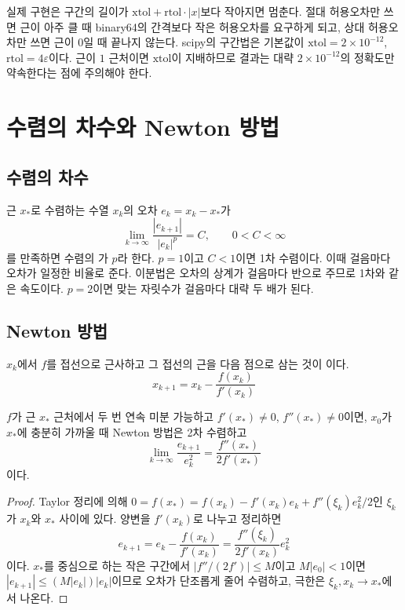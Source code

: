 실제 구현은 구간의 길이가 $\mathrm{xtol}+\mathrm{rtol}\cdot|x|$보다 작아지면 멈춘다. 절대 허용오차만 쓰면 근이 아주 클 때 binary64의 간격보다 작은 허용오차를 요구하게 되고, 상대 허용오차만 쓰면 근이 $0$일 때 끝나지 않는다. scipy의 구간법은 기본값이 $\mathrm{xtol}=2\times10^{-12}$, $\mathrm{rtol}=4\varepsilon$이다. 근이 $1$ 근처이면 $\mathrm{xtol}$이 지배하므로 결과는 대략 $2\times10^{-12}$의 정확도만 약속한다는 점에 주의해야 한다.

\section{수렴의 차수와 Newton 방법}
\label{sec:newton}

\subsection{수렴의 차수}

근 $x_\ast$로 수렴하는 수열 $x_k$의 오차 $e_k=x_k-x_\ast$가
\[
\lim_{k\to\infty}\frac{|e_{k+1}|}{|e_k|^p}=C,\qquad0<C<\infty
\]
를 만족하면 수렴의 가 $p$라 한다. $p=1$이고 $C<1$이면 1차 수렴이다. 이때 걸음마다 오차가 일정한 비율로 준다. 이분법은 오차의 상계가 걸음마다 반으로 주므로 1차와 같은 속도이다. $p=2$이면 맞는 자릿수가 걸음마다 대략 두 배가 된다.

\subsection{Newton 방법}

$x_k$에서 $f$를 접선으로 근사하고 그 접선의 근을 다음 점으로 삼는 것이 이다.
\[
x_{k+1}=x_k-\frac{f(x_k)}{f'(x_k)}
\]

\begin{theorem}
\label{thm:newton-quadratic}
$f$가 근 $x_\ast$ 근처에서 두 번 연속 미분 가능하고 $f'(x_\ast)\ne0$, $f''(x_\ast)\ne0$이면, $x_0$가 $x_\ast$에 충분히 가까울 때 Newton 방법은 2차 수렴하고
\[
\lim_{k\to\infty}\frac{e_{k+1}}{e_k^2}=\frac{f''(x_\ast)}{2f'(x_\ast)}
\]
이다.
\end{theorem}

\begin{proof}
Taylor 정리에 의해 $0=f(x_\ast)=f(x_k)-f'(x_k)e_k+f''(\xi_k)e_k^2/2$인 $\xi_k$가 $x_k$와 $x_\ast$ 사이에 있다. 양변을 $f'(x_k)$로 나누고 정리하면
\[
e_{k+1}=e_k-\frac{f(x_k)}{f'(x_k)}=\frac{f''(\xi_k)}{2f'(x_k)}e_k^2
\]
이다. $x_\ast$를 중심으로 하는 작은 구간에서 $|f''/(2f')|\le M$이고 $M|e_0|<1$이면 $|e_{k+1}|\le(M|e_k|)|e_k|$이므로 오차가 단조롭게 줄어 수렴하고, 극한은 $\xi_k,x_k\to x_\ast$에서 나온다.
\end{proof}

